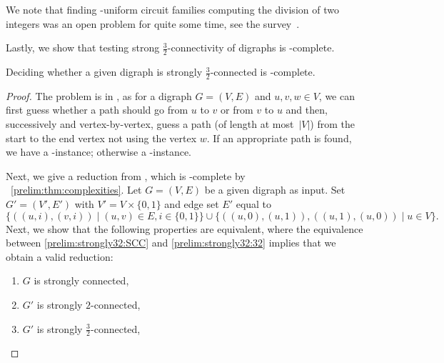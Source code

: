 We note that
finding \LOGSPACE-uniform
circuit families computing the division of two integers
was an open problem for quite some time, see the survey~\cite{DBLP:journals/eatcs/Allender01}.

Lastly, we show that testing  strong $\frac{3}{2}$-connectivity of digraphs is \NL-complete.

\begin{proposition}\label{prelim:prop:strongly32-NL-c}
	Deciding whether a given digraph is strongly $\frac{3}{2}$-connected
	is \NL-complete.	
\end{proposition}
\begin{proof}
	The problem is in \NL, as for a digraph $G = (V, E)$ and $u,v,w \in V$,
	we can first guess whether a path should go from 
	$u$ to $v$ or from $v$ to $u$
	and then, successively and vertex-by-vertex, guess
	a path  (of length at most~$|V|$) 
	from the start to the end vertex
	not using the vertex $w$.
	If an appropriate path is found, 
	we have a \rYES-instance; otherwise a \rNO-instance.
		
	Next, we give a reduction from \SCC, which is \NL-complete by \THM~\ref{prelim:thm:complexities}.
	Let $G = (V, E)$ be a given digraph as input.
	Set $G' = (V', E')$
	with $V' = V \times \{0,1\}$ and edge set $E'$
	equal to
	\[
	\{ ((u, i), (v, i)) \mid (u,v) \in E, i \in \{0,1\} \} \cup 
	\{ ((u, 0), (u, 1)), ((u, 1), (u,0)) \mid u \in V\}.	
	\]	
	Next, we show that
	the following properties are equivalent, where the equivalence between \ref{prelim:strongly32:SCC} and \ref{prelim:strongly32:32} 
	implies that we obtain a valid reduction: 
	\begin{enumerate}
		\item \label{prelim:strongly32:SCC} $G$ is strongly connected,
		
		\item $G'$ is strongly $2$-connected,
		
		\item \label{prelim:strongly32:32}  $G'$ is strongly $\frac{3}{2}$-connected,
		

\end{enumerate}
\end{proof}
